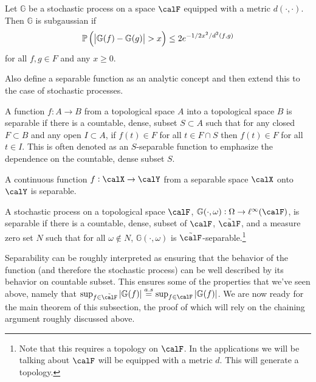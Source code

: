 \begin{definition}
	\label{def:subgaussian}
	Let \(\mathbb{G}\) be a stochastic process on a space \(\calF\) equipped with a metric \(d(\cdot,\cdot)\). Then  \(\mathbb{G}\) is subgaussian if
	\begin{equation}
		\label{eq:subgaussian}
		\P\left(\left|\mathbb{G}(f)-\mathbb{G}(g)\right|> x\right)\leq 2e^{-1/2x^2/d^2(f,g)}
	\end{equation}
	for all \(f,g \in F\) and any  \(x\geq 0\).
\end{definition}

Also define a separable function as an analytic concept and then extend this to the case of stochastic processes.

\begin{definition}
	\label{def:separable-function}
	A function \(f:A\to B\) from a topological space \(A\) into a topological space  \(B\) is separable if there is a countable, dense, subset  \(S \subset A\) such that  for any closed \(F \subset B\) and any open \(I \subset A\), if  \(f(t) \in F\) for all  \(t \in F \cap S\) then  \(f(t) \in F\) for all  \(t \in I\). This is often denoted as an \(S\)-separable function to emphasize the dependence on the countable, dense subset  \(S\).
\end{definition}
\begin{lemma}
	\label{lemma:continuous-separable}
	A continuous function \(f:\calX\to\calY\) from a separable space \(\calX\) onto  \(\calY\) is separable.
\end{lemma}


\begin{definition}
	\label{def:separable-process}
	A stochastic process on a topological space \(\calF\), \(\mathbb{G}(\cdot,\omega):\Omega \to \ell^\infty(\calF)\), is separable if there is a countable, dense, subset of \(\calF\), \(\tilde\calF\), and a measure zero set \(N\) such that for all \(\omega\not\in N\),  \(\mathbb{G}(\cdot,\omega)\) is \(\tilde\calF\)-separable.\footnote{Note that this requires a topology on \(\calF\). In the applications we will be talking about  \(\calF\) will be equipped with a metric  \(d\). This will generate a topology.} 
\end{definition}


Separability can be roughly interpreted as ensuring that the behavior of the function (and therefore the stochastic process) can be well described by its behavior on countable subset. This ensures some of the properties that we've seen above, namely that \(\sup_{f\in\tilde\calF}|\mathbb{G}(f)| \overset{a.s}{=} \sup_{f\in\calF}|\mathbb{G}(f)|\). We are now ready for the main theorem of this subsection, the proof of which will rely on the chaining argument roughly discussed above.

